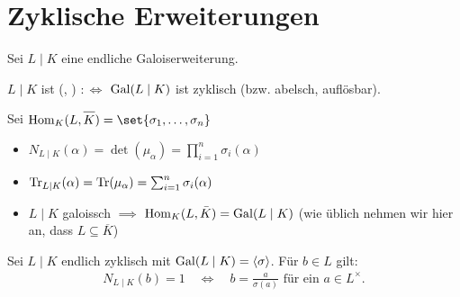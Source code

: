 \section{Zyklische Erweiterungen}
Sei $L \mid K$ eine endliche Galoiserweiterung.
\begin{definition}
	$L\mid K$ ist  (, ) $:\Leftrightarrow$ $\operatorname{Gal}(L\mid K)$ ist zyklisch (bzw. abelsch, auflösbar).
\end{definition}
\begin{remark}[Erinnerung]
	Sei $\Hom_K(L,\overline{K}) = \set{\sigma_1,\dots, \sigma_n}$
	\begin{itemize}
		\item $N_{L \mid K}(\alpha) = \det(\mu_{\alpha}) = \prod_{i=1}^n \sigma_i(\alpha)$
		\item $\operatorname{Tr}_{L\mid K}(\alpha) = \operatorname{Tr}(\mu_{\alpha}) = \sum_{i=1}^n \sigma_i(\alpha)$
		\item $L \mid K$ galoissch $\implies$ $\operatorname{Hom}_K(L, \bar K) = \operatorname{Gal}(L\mid K)$ (wie üblich nehmen wir hier an, dass $L \subseteq \overline{K}$)
	\end{itemize}
\end{remark}
\begin{proposition}
	Sei $L \mid K$ endlich zyklisch mit $\operatorname{Gal}(L \mid K) = \langle \sigma\rangle$. Für $b \in L$ gilt:
	\begin{align*}
		N_{L\mid K}(b)  = 1 \quad \Leftrightarrow \quad b = \frac{a}{\sigma(a)} \text{ für ein } a \in L^{\times}.
	\end{align*}
\end{proposition}

